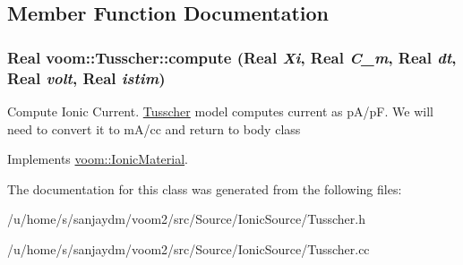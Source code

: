 \subsection{Member Function Documentation}
\hypertarget{classvoom_1_1_tusscher_a6ca3b7ba35dc82631a371d248fe5749b}{
\subsubsection[{compute}]{\setlength{\rightskip}{0pt plus 5cm}Real voom::Tusscher::compute (Real {\em Xi}, \/  Real {\em C\_\-m}, \/  Real {\em dt}, \/  Real {\em volt}, \/  Real {\em istim})}}
\label{classvoom_1_1_tusscher_a6ca3b7ba35dc82631a371d248fe5749b}


Compute Ionic Current. \hyperlink{classvoom_1_1_tusscher}{Tusscher} model computes current as pA/pF. We will need to convert it to mA/cc and return to body class 

Implements \hyperlink{classvoom_1_1_ionic_material_a1b95cf90af115374b428f2e5ece571cb}{voom::IonicMaterial}.

The documentation for this class was generated from the following files:\begin{DoxyCompactItemize}
\item 
/u/home/s/sanjaydm/voom2/src/Source/IonicSource/Tusscher.h\item 
/u/home/s/sanjaydm/voom2/src/Source/IonicSource/Tusscher.cc\end{DoxyCompactItemize}
